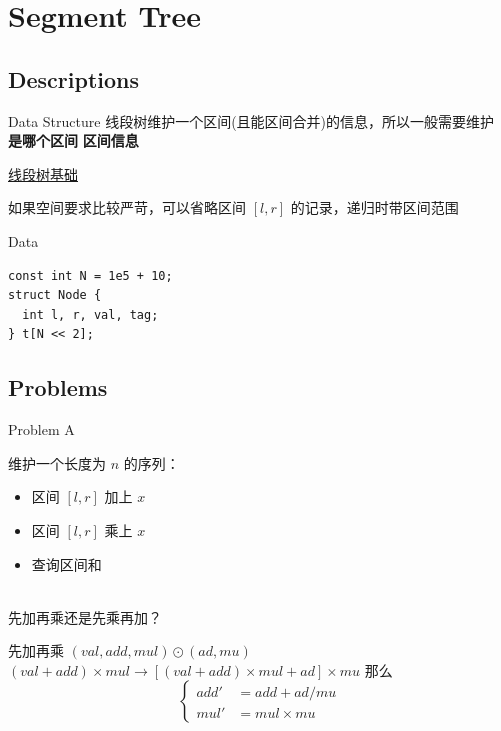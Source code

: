 \documentclass{beamer}
\begin{document}
\section{Segment Tree}

\subsection{Descriptions}

\begin{frame}[fragile]{Data Structure}
线段树维护一个区间(且能区间合并)的信息，所以一般需要维护 \textbf{是哪个区间} \textbf{区间信息}

\href{run:线段树基础.pdf}{线段树基础}

如果空间要求比较严苛，可以省略区间 $[l, r]$ 的记录，递归时带区间范围

\begin{block}{Data}
  \begin{lstlisting}
const int N = 1e5 + 10;
struct Node {
  int l, r, val, tag;
} t[N << 2];
  \end{lstlisting} 
\end{block}

\end{frame}

\subsection{Problems}
\begin{frame}{Problem A}
  \begin{problem}
维护一个长度为 $n$ 的序列：

\begin{itemize}
    \item 区间 $[l, r]$ 加上 $x$
    \item 区间 $[l, r]$ 乘上 $x$
    \item 查询区间和
\end{itemize}
  ~\\
  \pause 先加再乘还是先乘再加？
  \end{problem}
\end{frame}

\begin{frame}{先加再乘}
    $(val, add, mul) \odot (ad, mu)$
    $(val + add) \times mul \longrightarrow [(val + add) \times mul + ad] \times mu$
    \pause
    那么 $$\begin{cases} add' &= add + ad / mu \\ mul' &= mul \times mu \end{cases}$$
\end{frame}
\end{document}
